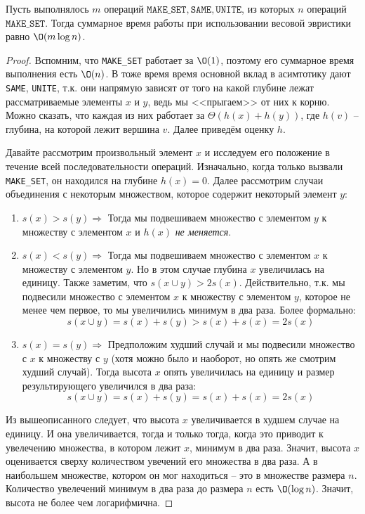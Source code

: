 \Th Пусть выполнялось $m$ операций $\texttt{MAKE\_SET}, \texttt{SAME}, \texttt{UNITE}$, из которых $n$ операций $\texttt{MAKE\_SET}$. Тогда суммарное время работы при использовании весовой эвристики равно $\O(m \log n)$.
\begin{proof}
    Вспомним, что \texttt{MAKE\_SET} работает за $\O(1)$, поэтому его суммарное время выполнения есть $\O(n)$. 
    В тоже время время основной вклад в асимтотику дают \texttt{SAME}, \texttt{UNITE}, т.к. они напрямую зависят от того на какой глубине лежат рассматриваемые элементы $x$ и $y$, ведь мы <<прыгаем>> от них к корню.
    Можно сказать, что каждая из них работает за $\Theta(h(x) + h(y))$, где $h(v)$ -- глубина, на которой лежит вершина $v$. Далее приведём оценку $h$.

    Давайте рассмотрим произвольный элемент $x$ и исследуем его положение в течение всей последовательности операций. Изначально, когда только вызвали \texttt{MAKE\_SET}, он находился на глубине $h(x) = 0$.
    Далее рассмотрим случаи объединения с некоторым множеством, которое содержит некоторый элемент $y$:
    \begin{enumerate}
        \item $s(x) > s(y) \Rightarrow$ Тогда мы подвешиваем множество с элементом $y$ к множеству с элементом $x$ и $h(x)$ \textit{не меняется}. 
        \item $s(x) < s(y) \Rightarrow$ Тогда мы подвешиваем множество с элементом $x$ к множеству с элементом $y$. Но в этом случае глубина $x$ увеличилась на единицу. Также заметим, что $s(x \cup y) > 2 s(x)$.
        Действительно, т.к. мы подвесили множество с элементом $x$ к множеству с элементом $y$, которое не менее чем первое, то мы увеличились минимум в два раза. Более формально:
        \begin{equation*}
            s(x \cup y) = s(x) + s(y) > s(x) + s(x) = 2s(x)
        \end{equation*}
        \item $s(x) = s(y) \Rightarrow$ Предположим худший случай и мы подвесили множество с $x$ к множеству с $y$ (хотя можно было и наоборот, но опять же смотрим худший случай). Тогда высота $x$ опять увеличилась на единицу и размер результирующего увеличился в два раза:
        \begin{equation*}
            s(x \cup y) = s(x) + s(y) = s(x) + s(x) = 2s(x)
        \end{equation*}
    \end{enumerate}

    Из вышеописанного следует, что высота $x$ увеличивается в худшем случае на единицу. И она увеличивается, тогда и только тогда, когда это приводит к увелечению множества, в котором лежит $x$, минимум в два раза.
    Значит, высота $x$ оценивается сверху количеством увечений его множества в два раза. А в наибольшем множестве, котором он мог находиться -- это в множестве размера $n$.
    Количество увелечений минимум в два раза до размера $n$ есть $\O(\log n)$. Значит, высота не более чем логарифмична.


\end{proof}
